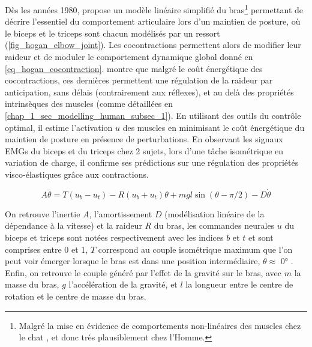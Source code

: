 Dès les années 1980, \textcite{hogan_adaptive_1984} propose un modèle linéaire simplifié du bras\footnote{Malgré la mise en évidence de comportements non-linéaires des muscles chez le chat \parencite{rack_effects_1969}, et donc très plausiblement chez l'Homme.} permettant de décrire l'essentiel du comportement articulaire lors d'un maintien de posture, où le biceps et le triceps sont chacun modélisés par un ressort (\cref{fig_hogan_elbow_joint}). Les cocontractions permettent alors de modifier leur raideur et de moduler le comportement dynamique global donné en \cref{eq_hogan_cocontraction}. \textcite{hogan_adaptive_1984} montre que malgré le coût énergétique des cocontractions, ces dernières permettent une régulation de la raideur par anticipation, sans délais (contrairement aux réflexes), et au delà des propriétés intrinsèques des muscles (comme détaillées en \cref{chap_1_sec_modelling_human_subsec_1}). En utilisant des outils du contrôle optimal, il estime l'activation $u$ des muscles en minimisant le coût énergétique du maintien de posture en présence de perturbations. En observant les signaux EMGs du biceps et du triceps chez 2 sujets, lors d'une tâche isométrique en variation de charge, il confirme ses prédictions sur une régulation des propriétés visco-élastiques grâce aux contractions.

\begin{equation} \label{eq_hogan_cocontraction}
	A \ddot{\theta} = T(u_b - u_t) - R(u_b + u_t)\theta + mgl \sin(\theta - \pi/2) - D \dot{\theta}
\end{equation}

On retrouve l'inertie $A$, l'amortissement $D$ (modélisation linéaire de la dépendance à la vitesse) et la raideur $R$ du bras, les commandes neurales $u$ du biceps et triceps sont notées respectivement avec les indices $b$ et $t$ et sont comprises entre 0 et 1, $T$ correspond au couple isométrique maximum que l'on peut voir émerger lorsque le bras est dans une position intermédiaire, $\theta \approx$ \ang{0} \parencite{hogan_adaptive_1984, linnamo_maximal_2006}. Enfin, on retrouve le couple généré par l'effet de la gravité sur le bras, avec $m$ la masse du bras, $g$ l'accélération de la gravité, et $l$ la longueur entre le centre de rotation et le centre de masse du bras.

\tikzexternalenable 


